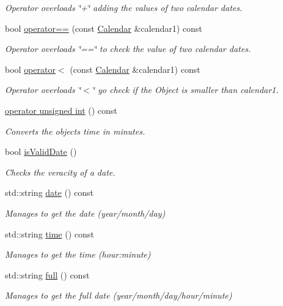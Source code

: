 \begin{DoxyCompactItemize}
\begin{DoxyCompactList}\small\item\em Operator overloads \char`\"{}+\char`\"{} adding the values of two calendar dates. \end{DoxyCompactList}\item 
bool \hyperlink{class_calendar_a25fdea266ecbfdf5e5dc0bde770b51c0}{operator==} (const \hyperlink{class_calendar}{Calendar} \&calendar1) const
\begin{DoxyCompactList}\small\item\em Operator overloads \char`\"{}==\char`\"{} to check the value of two calendar dates. \end{DoxyCompactList}\item 
bool \hyperlink{class_calendar_ab701051dc424c48d6f423cdf0bca6ad4}{operator$<$} (const \hyperlink{class_calendar}{Calendar} \&calendar1) const
\begin{DoxyCompactList}\small\item\em Operator overloads \char`\"{}$<$\char`\"{} yo check if the Object is smaller than calendar1. \end{DoxyCompactList}\item 
\hyperlink{class_calendar_a70f6e6b4f62dcca5c05bd9341d288b0a}{operator unsigned int} () const
\begin{DoxyCompactList}\small\item\em Converts the object\textquotesingle{}s time in minutes. \end{DoxyCompactList}\item 
bool \hyperlink{class_calendar_a5b30c644c6a7bf69c541c14fc7c4e47d}{is\+Valid\+Date} ()
\begin{DoxyCompactList}\small\item\em Checks the veracity of a date. \end{DoxyCompactList}\item 
std\+::string \hyperlink{class_calendar_a00249de42fc112c379f4bf139e77dd54}{date} () const
\begin{DoxyCompactList}\small\item\em Manages to get the date (year/month/day) \end{DoxyCompactList}\item 
std\+::string \hyperlink{class_calendar_ae8d5a30e386a154991cf0e32f7af4b2c}{time} () const
\begin{DoxyCompactList}\small\item\em Manages to get the time (hour\+:minute) \end{DoxyCompactList}\item 
std\+::string \hyperlink{class_calendar_a05c05a05e460dd25ce4a5bf1b8ae0ed8}{full} () const
\begin{DoxyCompactList}\small\item\em Manages to get the full date (year/month/day/hour/minute) \end{DoxyCompactList}\end{DoxyCompactItemize}
